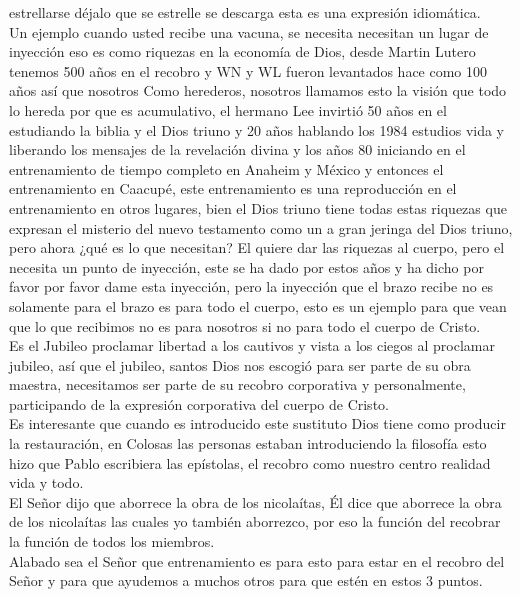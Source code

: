 \documentclass[12pt]{article}
\begin{document}
estrellarse déjalo que se estrelle se descarga esta es una expresión idiomática. \\

Un ejemplo cuando usted recibe una vacuna, se necesita necesitan un lugar de inyección eso es como riquezas en la economía de Dios, desde Martin Lutero tenemos 500 años en el recobro y WN y WL fueron levantados hace como 100 años así que nosotros Como herederos, nosotros llamamos esto la visión que todo lo hereda por que es acumulativo, el hermano Lee invirtió 50 años en el estudiando la biblia y el Dios triuno y 20 años hablando los 1984 estudios vida y liberando los mensajes de la revelación divina y los años 80 iniciando en el entrenamiento de tiempo completo en Anaheim y México y entonces el entrenamiento en Caacupé, este entrenamiento es una reproducción en el entrenamiento en otros lugares, bien el Dios triuno tiene todas estas riquezas que expresan el misterio del nuevo testamento como un a gran jeringa del Dios triuno, pero ahora ¿qué es lo que necesitan? El quiere dar las riquezas al cuerpo, pero el necesita un punto de inyección, este se ha dado por estos años y ha dicho por favor por favor dame esta inyección, pero la inyección que el brazo recibe no es solamente para el brazo es para todo el cuerpo, esto es un ejemplo para que vean que lo que recibimos no es para nosotros si no para todo el cuerpo de Cristo.\\

Es el Jubileo proclamar libertad a los cautivos y vista a los ciegos al proclamar jubileo, así que el jubileo, santos Dios nos escogió para ser parte de su obra maestra, necesitamos ser parte de su recobro corporativa y personalmente, participando de la expresión corporativa del cuerpo de Cristo.\\

Es interesante que cuando es introducido este sustituto Dios tiene como producir la restauración, en Colosas las personas estaban introduciendo la filosofía esto hizo que Pablo escribiera las epístolas, el recobro como nuestro centro realidad vida y todo.\\

El Señor dijo que aborrece la obra de los nicolaítas, Él dice que aborrece la obra de los nicolaítas las cuales yo también aborrezco, por eso la función del recobrar la función de todos los miembros.\\

Alabado sea el Señor que entrenamiento es para esto para estar en el recobro del Señor y para que ayudemos a muchos otros para que estén en estos 3 puntos.\\
\end{document}
